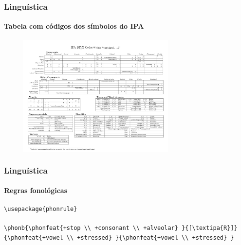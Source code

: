 \begin{frame}[fragile]
\frametitle{Linguística}
\framesubtitle{Tabela com códigos dos símbolos do IPA}
\vspace{-4ex}
\begin{figure}[h!]
  \centering
  \label{fig:tipachart}
  \includegraphics[width=0.7\textwidth,height=0.9\textheight,keepaspectratio]
                     {figures/tipachart_mod.pdf}
\end{figure}
\end{frame}


\begin{frame}[fragile]
\frametitle{Linguística}
\framesubtitle{Regras fonológicas}
  \scriptsize
  \begin{verbatim}
\usepackage{phonrule}
  
\phonb{\phonfeat{+stop \\ +consonant \\ +alveolar} }{[\textipa{R}]}
{\phonfeat{+vowel \\ +stressed} }{\phonfeat{+vowel \\ +stressed} }
  \end{verbatim}

  \begin{fmpage}{\textwidth}
  \end{fmpage}

\end{frame}


